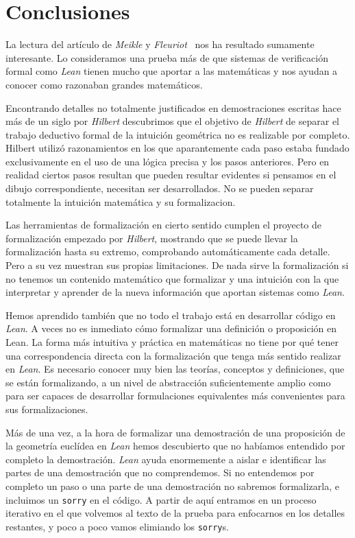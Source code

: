 \section{Conclusiones}

La lectura del artículo de \textit{Meikle} y
\textit{Fleuriot}~\cite{meikleFormalizingHilbertGrundlagen2003} nos ha resultado
sumamente interesante. Lo consideramos una prueba más de que sistemas de
verificación formal como \textit{Lean} tienen mucho que aportar a las matemáticas
y nos ayudan a conocer como razonaban grandes matemáticos.

Encontrando detalles no totalmente justificados en demostraciones escritas hace
más de un siglo por \textit{Hilbert} descubrimos que el objetivo de
\textit{Hilbert} de separar el trabajo deductivo formal de la intuición
geométrica no es realizable por completo. Hilbert utilizó razonamientos
en los que aparantemente cada paso estaba fundado exclusivamente en el uso de
una lógica precisa y los pasos anteriores. Pero en realidad ciertos pasos
resultan que pueden resultar evidentes si pensamos en el dibujo correspondiente,
necesitan ser desarrollados. No se pueden separar totalmente la intuición
matemática y su formalizacion.

Las herramientas de formalización en cierto sentido cumplen el proyecto de
formalización empezado por \textit{Hilbert}, mostrando que se puede llevar la
formalización hasta su extremo, comprobando automáticamente cada detalle. Pero a
su vez muestran sus propias limitaciones. De nada sirve la formalización si no
tenemos un contenido matemático que formalizar y una intuición con la que
interpretar y aprender de la nueva información que aportan sistemas como
\textit{Lean}.

Hemos aprendido también que no todo el trabajo está en desarrollar código en
\textit{Lean}. A veces no es inmediato cómo formalizar una definición o
proposición en Lean. La forma más intuitiva y práctica en matemáticas no tiene
por qué tener una correspondencia directa con la formalización que tenga más
sentido realizar en \textit{Lean}. Es necesario conocer muy bien las teorías,
conceptos y definiciones, que se están formalizando, a un nivel de abstracción
suficientemente amplio como para ser capaces de desarrollar formulaciones
equivalentes más convenientes para sus formalizaciones.

Más de una vez, a la hora de formalizar una demostración de una proposición de
la geometría euclídea en \textit{Lean} hemos descubierto que no habíamos
entendido por completo la demostración. \textit{Lean} ayuda enormemente a aislar
e identificar las partes de una demostración que no comprendemos. Si no
entendemos por completo un paso o una parte de una demostración no sabremos
formalizarla, e incluimos un \lstinline{sorry} en el código. A partir de aquí
entramos en un proceso iterativo en el que volvemos al texto de la prueba para
enfocarnos en los detalles restantes, y poco a poco vamos elimiando los
\lstinline{sorry}s.

